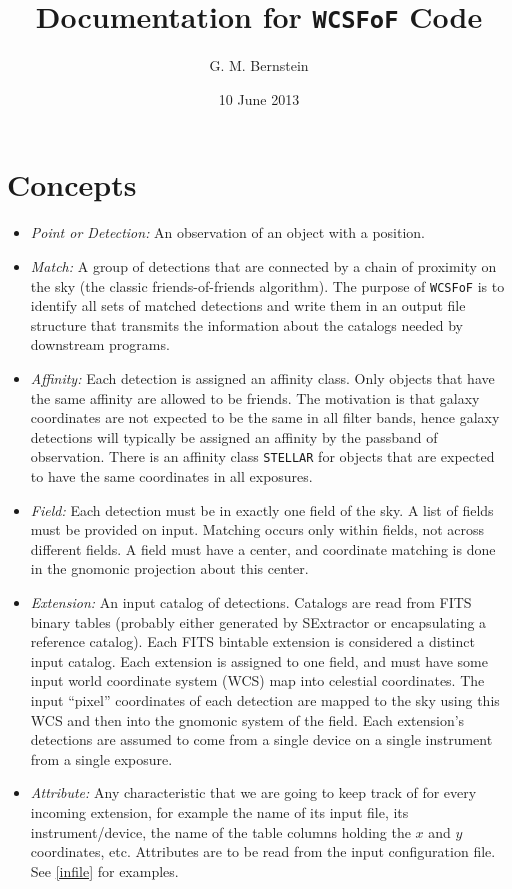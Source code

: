\documentclass[11pt,preprint,flushrt]{aastex}
\begin{document}
\title{Documentation for {\tt WCSFoF} Code}

\author{G. M. Bernstein}
\date{10 June 2013}

\section{Concepts}
\begin{itemize}
\item {\it Point or Detection:}  An observation of an object with a position. 
\item {\it Match:} A group of detections that are connected by a chain of proximity on the sky (the classic friends-of-friends algorithm).  The purpose of {\tt WCSFoF} is to identify all sets of matched detections and write them in an output file structure that transmits the information about the catalogs needed by downstream programs.
\item {\it Affinity:} Each detection is assigned an affinity class.  Only objects that have the same affinity are allowed to be friends.  The motivation is that galaxy coordinates are not expected to be the same in all filter bands, hence galaxy detections will typically be assigned an affinity by the passband of observation.  There is an affinity class {\tt STELLAR} for objects that are expected to have the same coordinates in all exposures.
\item {\it Field:} Each detection must be in exactly one field of the sky.  A list of fields must be provided on input.  Matching occurs only within fields, not across different fields.  A field must have a center, and coordinate matching is done in the gnomonic projection about this center.  
\item {\it Extension:} An input catalog of detections.  Catalogs are read from FITS binary tables (probably either generated by SExtractor or encapsulating a reference catalog).  Each FITS bintable extension is considered a distinct input catalog.  Each extension is assigned to one field, and must have some input world coordinate system (WCS) map into celestial coordinates.  The input ``pixel'' coordinates of each detection are mapped to the sky using this WCS and then into the gnomonic system of the field. Each extension's detections are assumed to come from a single device on a single instrument from a single exposure.
\item {\it Attribute:} Any characteristic that we are going to keep track of for every incoming extension, for example the name of its input file, its instrument/device, the name of the table columns holding the $x$ and $y$ coordinates, etc. Attributes are to be read from the input configuration file.  See \ref{infile} for examples.

\end{itemize}
\end{document}
